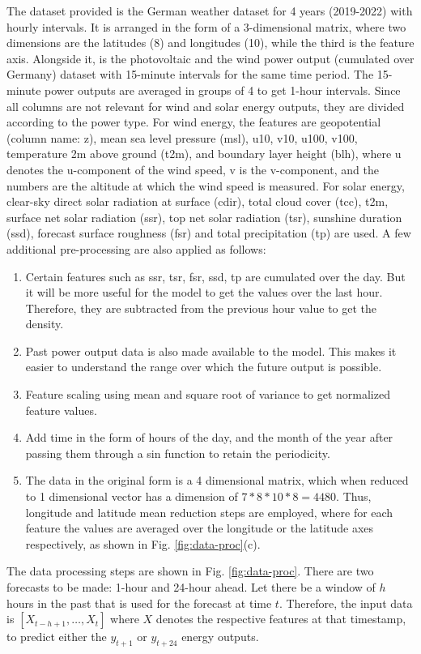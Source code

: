 \documentclass{article}
\begin{document}
The dataset provided is the German weather dataset for 4 years (2019-2022) with hourly intervals. It is arranged in the form of a 3-dimensional matrix, where two dimensions are the latitudes (8) and longitudes (10), while the third is the feature axis. Alongside it, is the photovoltaic and the wind power output (cumulated over Germany) dataset with 15-minute intervals for the same time period. The 15-minute power outputs are averaged in groups of 4 to get 1-hour intervals. Since all columns are not relevant for wind and solar energy outputs, they are divided according to the power type. For wind energy, the features are geopotential (column name: z), mean sea level pressure (msl), u10, v10, u100, v100, temperature 2m above ground (t2m), and boundary layer height (blh), where u denotes the u-component of the wind speed, v is the v-component, and the numbers are the altitude at which the wind speed is measured. For solar energy, clear-sky direct solar radiation at surface (cdir), total cloud cover (tcc), t2m, surface net solar radiation (ssr), top net solar radiation (tsr), sunshine duration (ssd), forecast surface roughness (fsr) and total precipitation (tp) are used. A few additional pre-processing are also applied as follows: 
\begin{enumerate}
  \item Certain features such as ssr, tsr, fsr, ssd, tp are cumulated over the day. But it will be more useful for the model to get the values over the last hour. Therefore, they are subtracted from the previous hour value to get the density.
  \item Past power output data is also made available to the model. This makes it easier to understand the range over which the future output is possible.
  \item Feature scaling using mean and square root of variance to get normalized feature values.
  \item Add time in the form of hours of the day, and the month of the year after passing them through a sin function to retain the periodicity.
  \item The data in the original form is a 4 dimensional matrix, which when reduced to 1 dimensional vector has a dimension of $7*8*10*8=4480$. Thus, longitude and latitude mean reduction steps are employed, where for each feature the values are averaged over the longitude or the latitude axes respectively, as shown in Fig. \ref{fig:data-proc}(c). 
\end{enumerate}

The data processing steps are shown in Fig. \ref{fig:data-proc}. There are two forecasts to be made: 1-hour and 24-hour ahead. Let there be a window of $h$ hours in the past that is used for the forecast at time $t$. Therefore, the input data is $[X_{t-h+1}, \dots, X_{t}]$ where $X$ denotes the respective features at that timestamp, to predict either the $y_{t+1}$ or $y_{t+24}$ energy outputs.  
\end{document}
